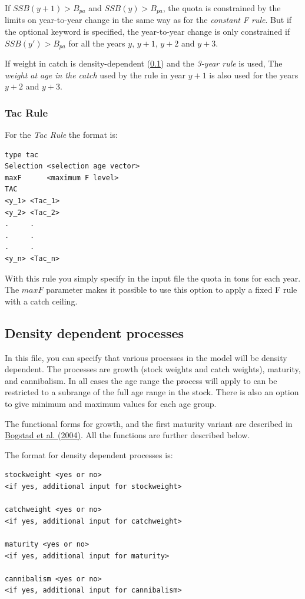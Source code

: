 \documentclass[12pt,twoside,a4paper]{article}
\begin{document}
If $SSB(y+1)>B_{pa}$ and $SSB(y)>B_{pa}$, the quota is constrained by the limits
on year-to-year change in the same way as for the \emph{constant F rule}. But if the
optional keyword  is specified, the year-to-year change 
is only constrained if $SSB(y')>B_{pa}$ for all the years $y$, $y+1$, $y+2$ and $y+3$.

If weight in catch is density-dependent (\ref{density})
and the \emph{3-year rule} is used, The \emph{weight at age in the catch} used by
the rule in year $y+1$ is also used for the years $y+2$ and $y+3$.

\subsubsection{Tac Rule}
\label{tacr}
For the \emph{Tac Rule} the format is:
\begin{verbatim}
type tac
Selection <selection age vector>
maxF      <maximum F level>
TAC
<y_1> <Tac_1>
<y_2> <Tac_2>
.     .
.     .
.     .
<y_n> <Tac_n>
\end{verbatim}
With this rule you simply specify in the input file the quota in tons
for each year.  The $maxF$ parameter makes it possible to 
use this option to apply a fixed F rule with a catch ceiling.

\subsection{Density dependent processes}
\label{density}
In this file, you can specify that various processes in the model will
be density dependent. The processes are growth (stock weights and
catch weights), maturity, and cannibalism. In all cases the age range
the process will apply to can be restricted to a subrange of the full
age range in the stock. There is also an option to give minimum and
maximum values for each age group.

The functional forms for growth, and the first maturity variant are
described in \hyperlink{bogstad}{Bogstad et al. (2004)}. 
All the functions are further described below.

The format for density dependent processes is:
\begin{verbatim}
stockweight <yes or no>
<if yes, additional input for stockweight>

catchweight <yes or no>
<if yes, additional input for catchweight>

maturity <yes or no>
<if yes, additional input for maturity>

cannibalism <yes or no>
<if yes, additional input for cannibalism>
\end{verbatim}
\end{document}
